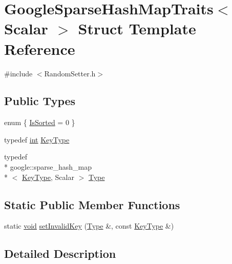 \hypertarget{struct_google_sparse_hash_map_traits}{\section{Google\-Sparse\-Hash\-Map\-Traits$<$ Scalar $>$ Struct Template Reference}
\label{struct_google_sparse_hash_map_traits}
}


{\ttfamily \#include $<$Random\-Setter.\-h$>$}

\subsection*{Public Types}
\begin{DoxyCompactItemize}
\item 
enum \{ \hyperlink{struct_google_sparse_hash_map_traits_a5f66abae01143b1a0a33e1e2ac480f97a85952f629c170f1606efc82f3f3c7d8b}{Is\-Sorted} = 0
 \}
\item 
typedef \hyperlink{ioapi_8h_a787fa3cf048117ba7123753c1e74fcd6}{int} \hyperlink{struct_google_sparse_hash_map_traits_aa05d80f01b5646ee1b043e872b2d9526}{Key\-Type}
\item 
typedef \\*
google\-::sparse\-\_\-hash\-\_\-map\\*
$<$ \hyperlink{struct_google_sparse_hash_map_traits_aa05d80f01b5646ee1b043e872b2d9526}{Key\-Type}, Scalar $>$ \hyperlink{struct_google_sparse_hash_map_traits_a45276c8bf8dae7a6cb6ad6a0299a6b20}{Type}
\end{DoxyCompactItemize}
\subsection*{Static Public Member Functions}
\begin{DoxyCompactItemize}
\item 
static \hyperlink{group___u_a_v_objects_plugin_ga444cf2ff3f0ecbe028adce838d373f5c}{void} \hyperlink{struct_google_sparse_hash_map_traits_a64ce4bd8f1870f15103b75bfb80125ec}{set\-Invalid\-Key} (\hyperlink{struct_google_sparse_hash_map_traits_a45276c8bf8dae7a6cb6ad6a0299a6b20}{Type} \&, const \hyperlink{struct_google_sparse_hash_map_traits_aa05d80f01b5646ee1b043e872b2d9526}{Key\-Type} \&)
\end{DoxyCompactItemize}


\subsection{Detailed Description}
